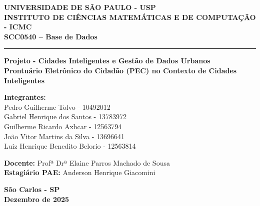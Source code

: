 \documentclass[12pt, a4paper]{article}
\begin{document}
\begin{titlepage}
    \begin{center}
        \textbf{\large UNIVERSIDADE DE SÃO PAULO - USP}\\
        \vspace{0.5cm}
        \textbf{\large INSTITUTO DE CIÊNCIAS MATEMÁTICAS E DE COMPUTAÇÃO - ICMC}\\
        \vspace{0.5cm}
        \textbf{\large SCC0540 – Base de Dados}\\
        \rule{\linewidth}{0.5mm}
        \vspace{3cm}
        
        \textbf{\Large Projeto - Cidades Inteligentes e Gestão de Dados Urbanos}\\
        \vspace{0.5cm}
        \textbf{\large Prontuário Eletrônico do Cidadão (PEC) no Contexto de Cidades Inteligentes}
        
        \vspace{3cm}
        
        \begin{flushright}
            \begin{minipage}{0.5\textwidth}
                \textbf{Integrantes:}\\
                Pedro Guilherme Tolvo - 10492012 \\
                Gabriel Henrique dos Santos - 13783972 \\
                Guilherme Ricardo Axhcar - 12563794 \\
                João Vitor Martins da Silva - 13696641 \\
                Luiz Henrique Benedito Belorio - 12563814 
                
                \vspace{1cm}
                \textbf{Docente:} Profª Drª Elaine Parros Machado de Sousa \\
                \textbf{Estagiário PAE:} Anderson Henrique Giacomini
            \end{minipage}
        \end{flushright}
        
        \vfill
        
        \textbf{São Carlos - SP}\\
        \textbf{Dezembro de 2025}
    \end{center}
\end{titlepage}
\end{document}
